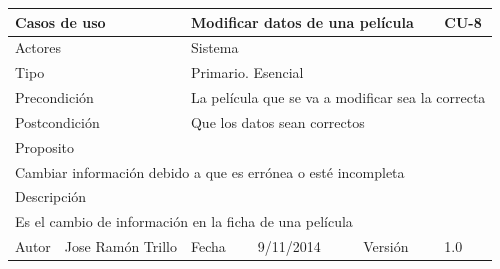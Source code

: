 \documentclass{article}
\begin{document}
\begin{table}[h]
\begin{tabular}{|l|l|l|l|l|l|}
\hline
\multicolumn{2}{|p{2cm}|}{Casos de uso}  & \multicolumn{3}{p{7cm}|}{\textbf{Modificar datos de una película}} & CU-8 \\
\hline
\multicolumn{2}{|p{2cm}|}{Actores}       & \multicolumn{4}{p{8cm}|}{Sistema}        \\
\hline
\multicolumn{2}{|p{2cm}|}{Tipo}          & \multicolumn{4}{p{8cm}|}{Primario. Esencial}        \\
\hline
\multicolumn{2}{|p{2cm}|}{Precondición}  & \multicolumn{4}{p{8cm}|}{La película que se va a modificar sea la correcta}        \\
\hline
\multicolumn{2}{|p{2cm}|}{Postcondición} & \multicolumn{4}{p{8cm}|}{Que los datos sean correctos}        \\
\hline
\multicolumn{6}{|p{10cm}|}{Proposito}                                   \\
\hline
\multicolumn{6}{|p{10cm}|}{Cambiar información debido a que es errónea o esté incompleta}                                            \\
\hline
\multicolumn{6}{|p{10cm}|}{Descripción}                                 \\
\hline
\multicolumn{6}{|p{10cm}|}{Es el cambio de información en la ficha de una película}                                            \\
\hline
Autor              &     Jose Ramón Trillo         & Fecha    & 9/11/2014    &   Versión  &1.0\\
\hline
\end{tabular}
\end{table}
\end{document}
